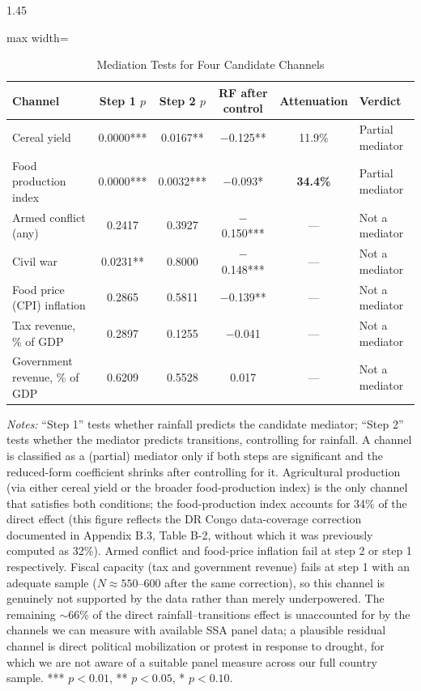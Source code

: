 \documentclass[12pt]{article}
\begin{document}
\begin{bibunit}[jpe]
\begin{spacing}{1.45}
\begin{table}[H]
\centering
\begin{adjustbox}{max width=\textwidth}
\begin{threeparttable}
\caption{Mediation Tests for Four Candidate Channels}
\label{tab:E4}
\begin{tabular}{lccccl}
\toprule
Channel & Step 1 $p$ & Step 2 $p$ & RF after control & Attenuation & Verdict \\
\midrule
Cereal yield              & 0.0000*** & 0.0167**  & $-$0.125** & 11.9\%  & Partial mediator \\
Food production index     & 0.0000*** & 0.0032*** & $-$0.093*  & \textbf{34.4\%} & Partial mediator \\
Armed conflict (any)      & 0.2417    & 0.3927    & $-$0.150*** & --- & Not a mediator \\
Civil war                 & 0.0231**  & 0.8000    & $-$0.148*** & --- & Not a mediator \\
Food price (CPI) inflation & 0.2865   & 0.5811    & $-$0.139** & --- & Not a mediator \\
Tax revenue, \% of GDP    & 0.2897    & 0.1255    & $-$0.041   & --- & Not a mediator \\
Government revenue, \% of GDP & 0.6209 & 0.5528   & 0.017      & --- & Not a mediator \\
\bottomrule
\end{tabular}
\begin{tablenotes}[flushleft]
\footnotesize
\item \textit{Notes:} ``Step 1'' tests whether rainfall predicts the candidate mediator; ``Step 2'' tests whether the mediator predicts transitions, controlling for rainfall. A channel is classified as a (partial) mediator only if both steps are significant and the reduced-form coefficient shrinks after controlling for it. Agricultural production (via either cereal yield or the broader food-production index) is the only channel that satisfies both conditions; the food-production index accounts for 34\% of the direct effect (this figure reflects the DR Congo data-coverage correction documented in Appendix B.3, Table B-2, without which it was previously computed as 32\%). Armed conflict and food-price inflation fail at step 2 or step 1 respectively. Fiscal capacity (tax and government revenue) fails at step 1 with an adequate sample ($N\approx550$--600 after the same correction), so this channel is genuinely not supported by the data rather than merely underpowered. The remaining $\sim$66\% of the direct rainfall--transitions effect is unaccounted for by the channels we can measure with available SSA panel data; a plausible residual channel is direct political mobilization or protest in response to drought, for which we are not aware of a suitable panel measure across our full country sample. *** $p<0.01$, ** $p<0.05$, * $p<0.10$.
\end{tablenotes}
\end{threeparttable}
\end{adjustbox}
\end{table}

\putbib[refs]
\end{spacing}
\end{bibunit}
\end{document}
